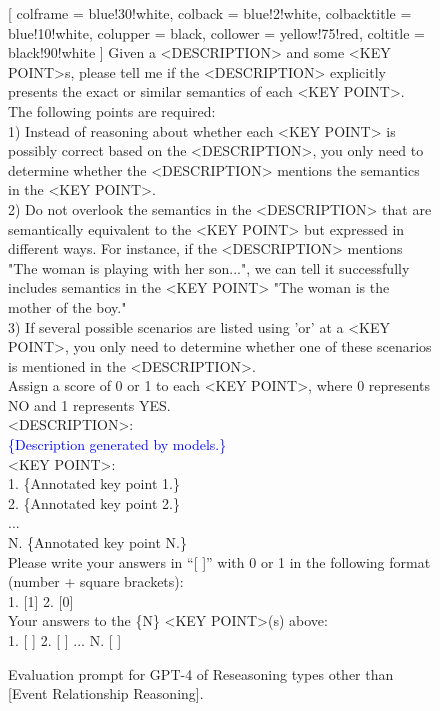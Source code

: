 \begin{figure}[h]
  \begin{tcolorbox}
      [
      colframe = blue!30!white, 
      colback = blue!2!white,
      colbacktitle = blue!10!white,
      colupper = black, collower = yellow!75!red,
      coltitle = black!90!white
      ]
      \noindent
      \small
      Given a <DESCRIPTION> and some <KEY POINT>s, please tell me if the <DESCRIPTION> explicitly presents the exact or similar semantics of each <KEY POINT>. The following points are required: \\

      1) Instead of reasoning about whether each <KEY POINT> is possibly correct based on the <DESCRIPTION>, you only need to determine whether the <DESCRIPTION> mentions the semantics in the <KEY POINT>. \\
      2) Do not overlook the semantics in the <DESCRIPTION> that are semantically equivalent to the <KEY POINT> but expressed in different ways. For instance, if the <DESCRIPTION> mentions "The woman is playing with her son...", we can tell it successfully includes semantics in the <KEY POINT> "The woman is the mother of the boy." \\
      3) If several possible scenarios are listed using 'or' at a <KEY POINT>, you only need to determine whether one of these scenarios is mentioned in the <DESCRIPTION>. \\

      Assign a score of 0 or 1 to each <KEY POINT>, where 0 represents NO and 1 represents YES. \\

      {<DESCRIPTION>:} \\
      \textcolor{blue}{\{Description generated by models.\}} \\

      {<KEY POINT>:} \\
      \textcolor{c2}{1. \{Annotated key point 1.\}} \\
      \textcolor{c2}{2. \{Annotated key point 2.\}} \\
      \textcolor{c2}{...} \\
      \textcolor{c2}{N. \{Annotated key point N.\}} \\
      

      Please write your answers in ``[ ]'' with 0 or 1 in the following format (number + square brackets): \\
      
      1. [1]  2. [0] \\
      
      Your answers to the \textcolor{c2}{\{N\}} <KEY POINT>(s) above: \\
      \textcolor{c2}{1. [ ]  2. [ ] ... N. [ ]}  \\
  \end{tcolorbox}
  \caption{Evaluation prompt for GPT-4 of Reseasoning types other than [Event Relationship Reasoning].}
  \label{fig:eval}
\end{figure}

